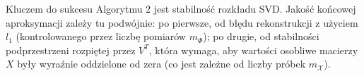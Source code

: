 Kluczem do sukcesu Algorytmu 2 jest stabilność rozkładu SVD. Jakość końcowej aproksymacji zależy tu podwójnie: po pierwsze, od błędu rekonstrukcji z użyciem $l_1$ (kontrolowanego przez liczbę pomiarów $m_\Phi$); po drugie, od stabilności podprzestrzeni rozpiętej przez $V^T$, która wymaga, aby wartości osobliwe macierzy $X$ były wyraźnie oddzielone od zera (co jest zależne od liczby próbek $m_\mathcal{X}$).
